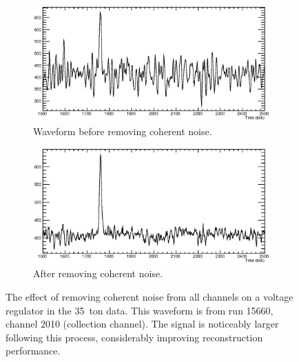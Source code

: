 \begin{figure}
  \centering
  \begin{subfigure}[t]{0.48\linewidth}
    \centering
    \includegraphics[width=\textwidth]{raw_noise.eps}
    \caption{Waveform before removing coherent noise.}
    \label{fig:CoherentNoiseRemovalNoise}
  \end{subfigure}
  \hfill
  \begin{subfigure}[t]{0.48\linewidth}
    \centering
    \includegraphics[width=\textwidth]{raw_nonoise.eps}
    \caption{After removing coherent noise.}
    \label{fig:CoherentNoiseRemovalNoNoise}
  \end{subfigure}
  \caption[The effect of removing coherent noise from all channels on a voltage regulator in the 35~ton data.]{The effect of removing coherent noise from all channels on a voltage regulator in the 35~ton data.  This waveform is from run 15660, channel 2010 (collection channel).  The signal is noticeably larger following this process, considerably improving reconstruction performance.}
  \label{fig:CoherentNoiseRemoval}
\end{figure}

